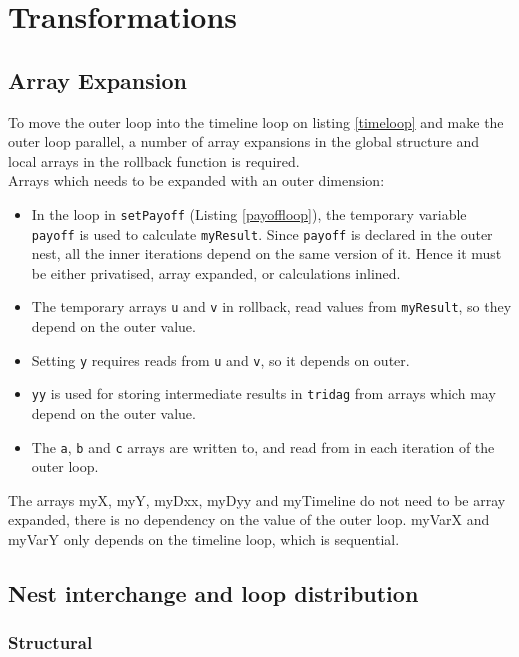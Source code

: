 \section{Transformations}

\subsection{Array Expansion}
\label{sec:arrayexp}
To move the outer loop into the timeline loop on listing \ref{timeloop} and make the outer loop parallel, a number of array expansions in the global structure and local arrays in the rollback function is required.\\
Arrays which needs to be expanded with an outer dimension:
\begin{itemize}
\item In the loop in \verb!setPayoff! (Listing \ref{payoffloop}), the temporary variable \verb!payoff! is used to calculate
 \verb!myResult!. Since \verb!payoff! is declared in the outer nest, all the inner iterations depend on the same version of it. Hence
 it must be either privatised, array expanded, or calculations inlined.
\item The temporary arrays \verb!u! and \verb!v! in rollback, read values from \verb!myResult!, so they depend on the outer value.
\item Setting \verb!y! requires reads from \verb!u! and \verb!v!, so it depends on outer.
\item \verb!yy! is used for storing intermediate results in \verb!tridag! from arrays which may depend on the outer value.
\item The \verb!a!, \verb!b! and \verb!c! arrays are written to, and read from in each iteration of the outer loop.
\end{itemize}

The arrays myX, myY, myDxx, myDyy and myTimeline do not need to be array expanded, there is no dependency on the value of the outer loop. myVarX and myVarY only depends on the timeline loop, which is sequential.

\subsection{Nest interchange and loop distribution}

\subsubsection{Structural}
